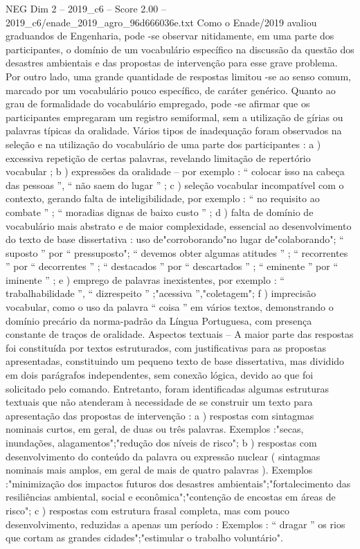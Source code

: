 \begin{textsample}{NEG Dim 2 – 2019\_c6 – Score 2.00 – 2019\_c6/enade\_2019\_agro\_96d666036e.txt}
Como o Enade/2019 avaliou graduandos de Engenharia, pode -se observar nitidamente, em uma parte dos participantes, o domínio de um vocabulário específico na discussão da questão dos desastres ambientais e das propostas de intervenção para esse grave problema.
Por outro lado, uma grande quantidade de respostas limitou -se ao senso comum, marcado por um vocabulário pouco específico, de caráter genérico.
Quanto ao grau de formalidade do vocabulário empregado, pode -se afirmar que os participantes empregaram um registro semiformal, sem a utilização de gírias ou palavras típicas da oralidade.
Vários tipos de inadequação foram observados na seleção e na utilização do vocabulário de uma parte dos participantes : a ) excessiva repetição de certas palavras, revelando limitação de repertório vocabular ; b ) expressões da oralidade – por exemplo : “ colocar isso na cabeça das pessoas ”, “ não saem do lugar ” ; c ) seleção vocabular incompatível com o contexto, gerando falta de inteligibilidade, por exemplo : “ no requisito ao combate ” ; “ moradias dignas de baixo custo ” ; d ) falta de domínio de vocabulário mais abstrato e de maior complexidade, essencial ao desenvolvimento do texto de base dissertativa : uso de"corroborando"no lugar de"colaborando"; “ suposto ” por “ pressuposto"; “ devemos obter algumas atitudes ” ; “ recorrentes ” por “ decorrentes ” ; “ destacados ” por “ descartados ” ; “ eminente ” por “ iminente ” ; e ) emprego de palavras inexistentes, por exemplo : “ trabalhabilidade ”, “ dizrespeito ” ;"acessiva ”,"coletagem"; f ) imprecisão vocabular, como o uso da palavra “ coisa ” em vários textos, demonstrando o domínio precário da norma-padrão da Língua Portuguesa, com presença constante de traços de oralidade.
Aspectos textuais – A maior parte das respostas foi constituída por textos estruturados, com justificativas para as propostas apresentadas, constituindo um pequeno texto de base dissertativa, mas dividido em dois parágrafos independentes, sem conexão lógica, devido ao que foi solicitado pelo comando.
Entretanto, foram identificadas algumas estruturas textuais que não atenderam à necessidade de se construir um texto para apresentação das propostas de intervenção : a ) respostas com sintagmas nominais curtos, em geral, de duas ou três palavras.
Exemplos :"secas, inundações, alagamentos";"redução dos níveis de risco"; b ) respostas com desenvolvimento do conteúdo da palavra ou expressão nuclear ( sintagmas nominais mais amplos, em geral de mais de quatro palavras ).
Exemplos :"minimização dos impactos futuros dos desastres ambientais";"fortalecimento das resiliências ambiental, social e econômica";"contenção de encostas em áreas de risco"; c ) respostas com estrutura frasal completa, mas com pouco desenvolvimento, reduzidas a apenas um período : Exemplos : “ dragar ” os rios que cortam as grandes cidades";"estimular o trabalho voluntário".

\end{textsample}
